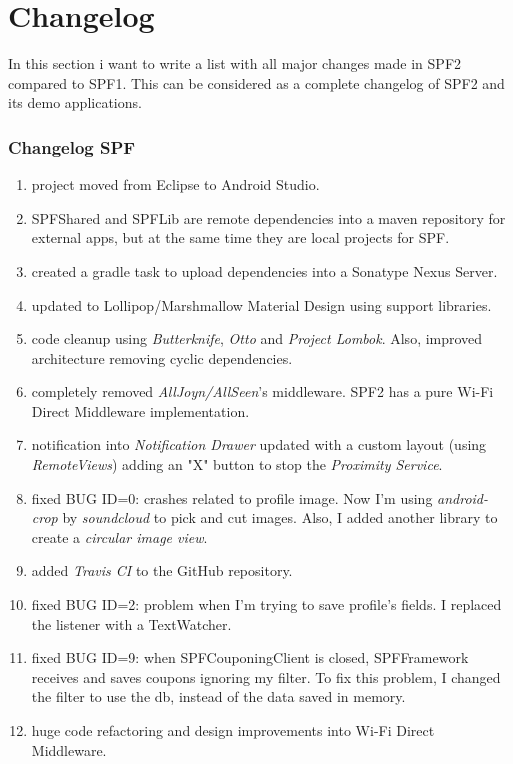 \chapter{Changelog}
\label{changelog}

In this section i want to write a list with all major changes made in SPF2 compared to SPF1. This can be considered as a complete changelog of SPF2 and its demo applications.

\subsection*{Changelog SPF}
\begin{enumerate}
	\item project moved from Eclipse to Android Studio.
	\item SPFShared and SPFLib are remote dependencies into a maven repository for external apps, but at the same time they are local projects for SPF.
	\item created a gradle task to upload dependencies into a Sonatype Nexus Server.
	\item updated to Lollipop/Marshmallow Material Design using support libraries.
	\item code cleanup using \emph{Butterknife}, \emph{Otto} and \emph{Project Lombok}. Also, improved architecture removing cyclic dependencies.
	\item completely removed \emph{AllJoyn/AllSeen}'s middleware. SPF2 has a pure Wi-Fi Direct Middleware implementation.
	\item notification into \emph{Notification Drawer} updated with a custom layout (using \emph{RemoteViews}) adding an "X" button to stop the \emph{Proximity Service}.
	\item fixed BUG ID=0: crashes related to profile image. Now I'm using \emph{android-crop} by \emph{soundcloud} to pick and cut images. Also, I added another library to create a \emph{circular image view}.
	\item added \emph{Travis CI} to the GitHub repository.
	\item fixed BUG ID=2: problem when I'm trying to save profile's fields. I replaced the listener with a \textsf{TextWatcher}.
	\item fixed BUG ID=9: when \textsf{SPFCouponingClient} is closed, \textsf{SPFFramework} receives and saves coupons ignoring my filter. To fix this problem, I changed the filter to use the db, instead of the data saved in memory.
	\item huge code refactoring and design improvements into Wi-Fi Direct Middleware.

\end{enumerate}
